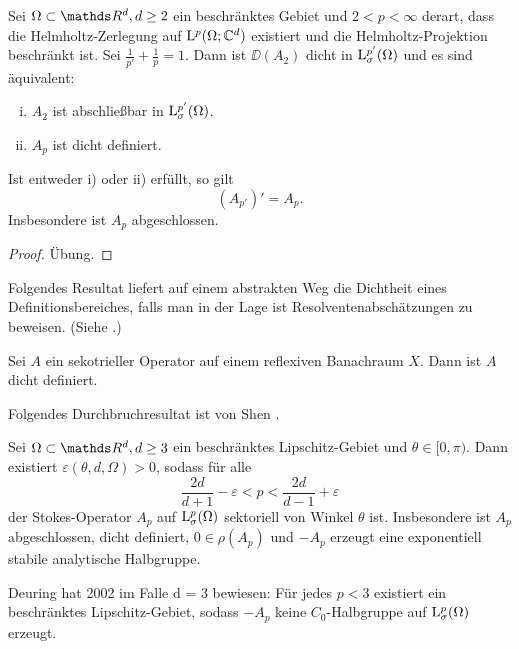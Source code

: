 \begin{prop}
  Sei $\Omega \subset \R^d, d\geq 2$ ein beschränktes Gebiet und $2 < p < \infty$ derart, dass die Helmholtz-Zerlegung auf $\mathrm{L}^p(\Omega; \mathbb{C}^d)$ existiert und die Helmholtz-Projektion beschränkt ist.
  Sei $\frac{1}{p'} + \frac{1}{p} = 1$.
  Dann ist $\DD(A_2)$ dicht in $\mathrm{L}_\sigma^{p'}(\Omega)$ und es sind äquivalent:
  \begin{enumerate}[i)]
    \item $A_2$ ist abschließbar in $\mathrm{L}_\sigma^{p'}(\Omega)$.
    \item $A_p$ ist dicht definiert.
  \end{enumerate}
  Ist entweder i) oder ii) erfüllt, so gilt
  $$
  (A_{p'})' = A_p.
  $$
  Insbesondere ist $A_p$ abgeschlossen.
\end{prop}

\begin{proof}
  Übung.
\end{proof}

Folgendes Resultat liefert auf einem abstrakten Weg die Dichtheit eines Definitionsbereiches, falls man in der Lage ist Resolventenabschätzungen zu beweisen.  (Siehe \cite[Prop. 2.1.1]{haase}.)

\begin{thm}
  Sei $A$ ein sekotrieller Operator auf einem reflexiven Banachraum $X$.
  Dann ist $A$ dicht definiert.
\end{thm}

Folgendes Durchbruchresultat ist von Shen \cite{shen}.

\begin{hsatz}
  \label{hsatz:shen}
  Sei $\Omega \subset \R^d, d \geq 3$ ein beschränktes Lipschitz-Gebiet und $\theta \in [0,\pi)$.
    Dann existiert $\varepsilon(\theta, d, \Omega) > 0$, sodass für alle
    $$
    \frac{2d}{d + 1} - \varepsilon < p < \frac{2d}{d - 1} + \varepsilon
    $$
    der Stokes-Operator $A_p$ auf $\mathrm{L}_\sigma^p(\Omega)$ sektoriell von Winkel $\theta$ ist.
    Insbesondere ist $A_p$ abgeschlossen, dicht definiert, $0 \in \rho(A_p)$ und  $-A_p$ erzeugt eine exponentiell stabile analytische Halbgruppe.
\end{hsatz}

\begin{rem}
  Deuring hat 2002 im Falle d = 3 bewiesen: Für jedes $p < 3$ existiert ein beschränktes Lipschitz-Gebiet, sodass $-A_p$ keine $C_0$-Halbgruppe auf $\mathrm{L}_\sigma^p(\Omega)$ erzeugt.
\end{rem}

